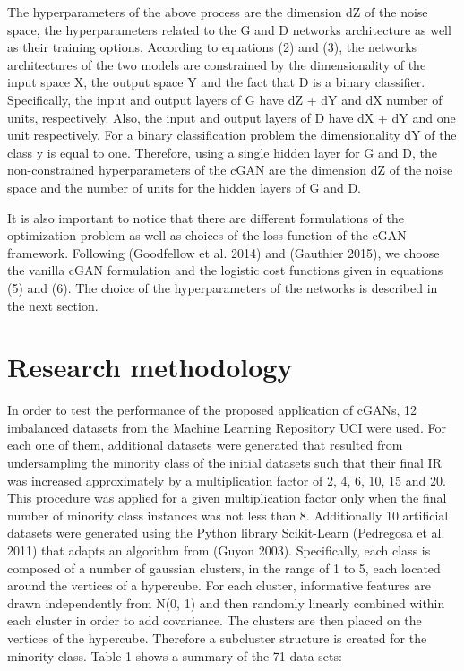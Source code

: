 \documentclass[parskip=full]{scrartcl}
\begin{document}
The hyperparameters of the above process are the dimension dZ of the noise
space, the hyperparameters related to the G and D networks architecture as well
as their training options. According to equations (2) and (3), the networks
architectures of the two models are constrained by the dimensionality of the
input space X, the output space Y and the fact that D is a binary classifier.
Specifically, the input and output layers of G have dZ + dY and dX number of
units, respectively. Also, the input and output layers of D have dX + dY and one
unit respectively. For a binary classification problem the dimensionality dY of
the class y is equal to one. Therefore, using a single hidden layer for G and D,
the non-constrained hyperparameters of the cGAN are the dimension dZ of the
noise space and the number of units for the hidden layers of G and D. 

It is also important to notice that there are different formulations of the
optimization problem as well as choices of the loss function of the cGAN
framework. Following (Goodfellow et al. 2014) and (Gauthier 2015), we choose the
vanilla cGAN formulation and the logistic cost functions given in equations (5)
and (6).  The choice of the hyperparameters of the networks is described in the
next section.

\section{Research methodology}

In order to test the performance of the proposed application of cGANs, 12
imbalanced datasets from the Machine Learning Repository UCI were used. For each
one of them, additional datasets were generated that resulted from undersampling
the minority class of the initial datasets such that their final IR was
increased approximately by a multiplication factor of 2, 4, 6, 10, 15 and 20.
This procedure was applied for a given multiplication factor only when the final
number of minority class instances was not less than 8. Additionally 10
artificial datasets were generated using the Python library Scikit-Learn
(Pedregosa et al. 2011) that adapts an algorithm from (Guyon 2003).
Specifically, each class is composed of a number of gaussian clusters, in the
range of 1 to 5, each located around the vertices of a hypercube. For each
cluster, informative features are drawn independently from N(0, 1) and then
randomly linearly combined within each cluster in order to add covariance. The
clusters are then placed on the vertices of the hypercube. Therefore a
subcluster structure is created for the minority class. Table 1 shows a summary
of the 71 data sets:
\end{document}
